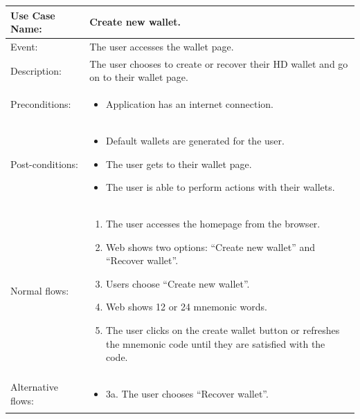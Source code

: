 \begin{table}[]
    \begin{tabular}{m{4cm}  m{11cm} }
        \toprule
        Use Case Name:     & Create new wallet.        \\
        \midrule 
        Event:             & The user accesses the wallet page.                                                    \\ 
        \midrule

        Description:       & The user chooses to create or recover their HD wallet and go on to their wallet page. \\ 

        \midrule
        Preconditions:     & \begin{itemize}
            \item Application has an internet connection.
        \end{itemize}                                                            \\
        \midrule
        Post-conditions:   & \begin{itemize}
            \item Default wallets are generated for the user.
            \item The user gets to their wallet page.
            \item The user is able to perform actions with their wallets.
        \end{itemize}                                                            \\ 
        \midrule
        Normal flows:      & \begin{enumerate}
            \item The user accesses the homepage from the browser.
            \item Web shows two options: “Create new wallet” and “Recover wallet”.
            \item Users choose “Create new wallet”.
            \item Web shows 12 or 24 mnemonic words.
            \item The user clicks on the create wallet button or refreshes the mnemonic code until they are satisfied with the code.
        \end{enumerate}                                                            \\ 
        \midrule
        Alternative flows: & \begin{itemize}
            \item {3a. The user chooses “Recover wallet”.}

\end{itemize}
\end{tabular}
\end{table}
